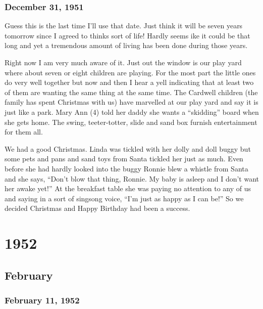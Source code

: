 \documentclass[
]{book}
\begin{document}
\hypertarget{december-31-1951}{%
\subsection{December 31, 1951}\label{december-31-1951}}

Guess this is the last time I'll use that date. Just think it will be seven years tomorrow since I agreed to thinks sort of life! Hardly seems ike it could be that long and yet a tremendous amount of living has been done during those years.

Right now I am very much aware of it. Just out the window is our play yard where about seven or eight children are playing. For the most part the little ones do very well together but now and then I hear a yell indicating that at least two of them are wanting the same thing at the same time. The Cardwell children (the family has spent Christmas with us) have marvelled at our play yard and say it is just like a park. Mary Ann (4) told her daddy she wants a ``skidding'' board when she gets home. The swing, teeter-totter, slide and sand box furnish entertainment for them all.

We had a good Christmas. Linda was tickled with her dolly and doll buggy but some pets and pans and sand toys from Santa tickled her just as much. Even before she had hardly looked into the buggy Ronnie blew a whistle from Santa and she says, ``Don't blow that thing, Ronnie. My baby is asleep and I don't want her awake yet!'' At the breakfast table she was paying no attention to any of us and saying in a sort of singsong voice, ``I'm just as happy as I can be!'' So we decided Christmas and Happy Birthday had been a success.

\hypertarget{section-4}{%
\chapter{1952}\label{section-4}}

\hypertarget{february-1}{%
\section{February}\label{february-1}}

\hypertarget{february-11-1952}{%
\subsection{February 11, 1952}\label{february-11-1952}}
\end{document}
